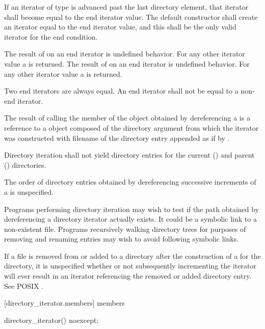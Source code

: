 \pnum
If an iterator of type  is advanced past the
last directory element, that iterator shall become equal to the end iterator
value. The  default constructor shall
create an iterator equal to the end iterator value, and this shall be the only
valid iterator for the end condition.

\pnum
The result of  on an end iterator is undefined behavior. For any other iterator value
a  is returned. The result of  on an end iterator is
undefined behavior. For any other iterator value a  is
returned.

\pnum
Two end iterators are always equal. An end iterator shall not be equal to a non-end
iterator.

\pnum
The result of calling the  member of the  object obtained by dereferencing a  is a reference to a  object composed of the directory argument from which the iterator was
constructed with filename of the directory entry appended as if by .

\pnum
Directory iteration shall not yield directory entries for the current ()
and parent () directories.

\pnum
The order of directory entries obtained by dereferencing successive
increments of a  is unspecified.

\pnum
\enternote
Programs performing directory iteration may wish to test if the
path obtained by dereferencing a directory iterator actually exists. It could be
a symbolic link to a non-existent file. Programs recursively
walking directory trees for purposes of removing and renaming entries may wish
to avoid following symbolic links.

\pnum
If a file  is removed from or added to a directory after the
construction of a  for the directory, it is
unspecified whether or not subsequently incrementing the iterator will ever
result in an iterator referencing the removed or added directory entry. See
POSIX .
\exitnote

[directory_iterator.members]{ members}

\begin{itemdecl}
directory_iterator() noexcept;
\end{itemdecl}

